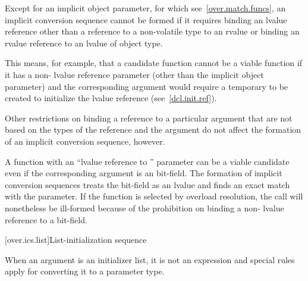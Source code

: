 \pnum
Except for an implicit object parameter, for which see~\ref{over.match.funcs},
an implicit conversion sequence cannot be formed if it requires
binding an lvalue reference
other than a reference to a non-volatile  type
to an rvalue
or binding an rvalue reference to an lvalue of object type.
\begin{note}
This means, for example, that a candidate function cannot be a viable
function if it has a non- lvalue reference parameter (other than
the implicit object parameter) and the corresponding argument
would require a temporary to be created to initialize the lvalue
reference (see~\ref{dcl.init.ref}).
\end{note}

\pnum
Other restrictions on binding a reference to a particular argument
that are not based on the types of the reference and the argument
do not affect the formation of an implicit conversion
sequence, however.
\begin{example}
A function with an ``lvalue reference to '' parameter can
be a viable candidate even if the corresponding argument is an
bit-field.
The formation of implicit conversion sequences
treats the
bit-field as an
lvalue and finds an exact
match with the parameter.
If the function is selected by overload
resolution, the call will nonetheless be ill-formed because of
the prohibition on binding a non- lvalue reference to a bit-field.
\end{example}

[over.ics.list]{List-initialization sequence}

\pnum
When an argument is an initializer list, it is not an
expression and special rules apply for converting it to a parameter type.

